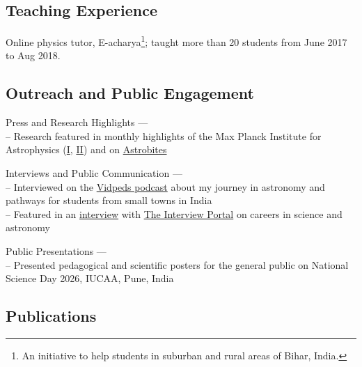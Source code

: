 \documentclass[12pt,letterpaper]{article}
\begin{document}
\vspace{-1.5mm}
\subsection{Teaching Experience}
\begin{list}{}{\cvlist}
\item Online physics tutor, E-acharya\footnote{An initiative to help students in suburban and rural areas of Bihar, India.}; taught more than 20 students from June 2017 to Aug 2018.
\end{list}

\vspace{-1.5mm}
\subsection{Outreach and Public Engagement}
\begin{list}{}{\cvlist}
\item Press and Research Highlights --- \\
-- Research featured in monthly highlights of the Max Planck Institute for Astrophysics (\href{https://www.mpa-garching.mpg.de/964620/hl202107}{I}, \href{https://www.mpa-garching.mpg.de/1066558/hl202211?c=27981}{II}) and on \href{https://astrobites.org/2021/05/06/cool-metal-gas-search-thanks-it-was-automated/}{Astrobites}

\item Interviews and Public Communication --- \\
-- Interviewed on the \href{https://www.youtube.com/watch?v=WmA_PnYLeCg}{Vidpeds podcast} about my journey in astronomy and pathways for students from small towns in India\\
-- Featured in an \href{https://theinterviewportal.com/2020/03/13/astrophysicist-interview-8/}{interview} with \href{https://theinterviewportal.com/}{The Interview Portal} on careers in science and astronomy

\item Public Presentations --- \\
-- Presented pedagogical and scientific posters for the general public on National Science Day 2026, IUCAA, Pune, India
\end{list}

\ifdefined\withpubs
  
  \subsection{Publications}
  
\end{document}
